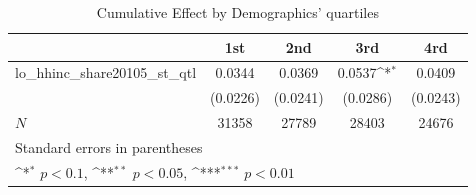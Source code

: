 \begin{table}[htbp]\centering
\def\sym#1{\ifmmode^{#1}\else\(^{#1}\)\fi}
\caption{Cumulative Effect by Demographics' quartiles}
\begin{tabular}{l*{4}{c}}
\hline\hline
            &\multicolumn{1}{c}{1st}&\multicolumn{1}{c}{2nd}&\multicolumn{1}{c}{3rd}&\multicolumn{1}{c}{4rd}\\
\hline
lo\_hhinc\_share20105\_st\_qtl&      0.0344         &      0.0369         &      0.0537\sym{*}  &      0.0409         \\
            &    (0.0226)         &    (0.0241)         &    (0.0286)         &    (0.0243)         \\
\hline
\(N\)       &       31358         &       27789         &       28403         &       24676         \\
\hline\hline
\multicolumn{5}{l}{\footnotesize Standard errors in parentheses}\\
\multicolumn{5}{l}{\footnotesize \sym{*} \(p<0.1\), \sym{**} \(p<0.05\), \sym{***} \(p<0.01\)}\\
\end{tabular}
\end{table}
